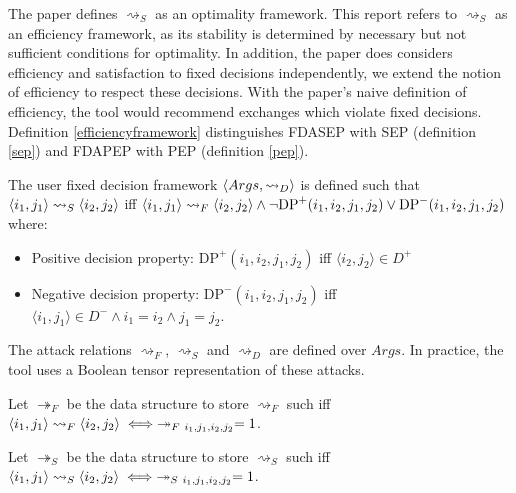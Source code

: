 The paper \cite{aes} defines $\rightsquigarrow_S$ as an optimality framework. This report refers to $\rightsquigarrow_S$ as an efficiency framework, as its stability is determined by necessary but not sufficient conditions for optimality. In addition, the paper does considers efficiency and satisfaction to fixed decisions independently, we extend the notion of efficiency to respect these decisions. With the paper's naive definition of efficiency, the tool would recommend exchanges which violate fixed decisions. Definition \ref{efficiencyframework} distinguishes FDASEP with SEP (definition \ref{sep}) and FDAPEP with PEP (definition \ref{pep}).

\begin{definition}
	\label{fixeddecisionframework}
	
	The user fixed decision framework $\langle{Args},{\rightsquigarrow_D}\rangle$ is defined such that $\langle{i_1},{j_1}\rangle\rightsquigarrow_S\langle{ i_2},{j_2}\rangle$ iff $\langle{i_1},{j_1}\rangle\rightsquigarrow_F\langle{i_2},{j_2}\rangle\land\neg\text{DP}^+(i_1,i_2,j_1,j_2)\lor\text{DP}^-(i_1,i_2,j_1,j_2)$ where:
	\begin{itemize}
		\item Positive decision property: $\text{DP}^+(i_1,i_2,j_1,j_2)$ iff $\langle i_2, j_2\rangle\in D^+$
		\item Negative decision property: $\text{DP}^-(i_1,i_2,j_1,j_2)$ iff $\langle i_1, j_1\rangle\in D^-\land i_1=i_2\land j_1=j_2$.
	\end{itemize}
\end{definition}

The attack relations $\rightsquigarrow_F$, $\rightsquigarrow_S$ and $\rightsquigarrow_D$ are defined over $Args$. In practice, the tool uses a Boolean tensor representation of these attacks.

\begin{definition}
	\label{tensorfeasiblityframework}
	
	Let $\twoheadrightarrow_F$ be the data structure to store $\rightsquigarrow_F$ such iff $\pair{i_1}{j_1}\rightsquigarrow_F\pair{i_2}{j_2}\iff\twoheadrightarrow_{F\ i_1,j_1,i_2,j_2}=1$.
\end{definition}

\begin{definition}
	\label{tensorefficiencyframework}
	
	Let $\twoheadrightarrow_S$ be the data structure to store $\rightsquigarrow_S$ such iff $\pair{i_1}{j_1}\rightsquigarrow_S\pair{i_2}{j_2}\iff\twoheadrightarrow_{S\ i_1,j_1,i_2,j_2}=1$.
\end{definition}

